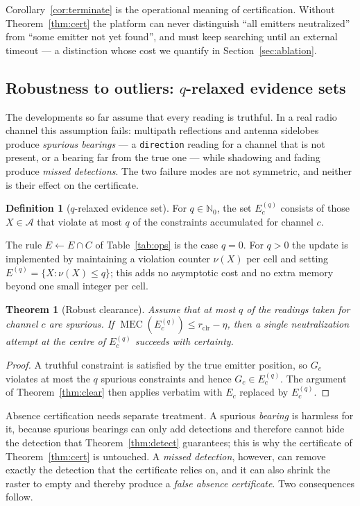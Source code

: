 \documentclass[journal,10pt]{IEEEtran}
\newtheorem{theorem}{Theorem}
\theoremstyle{definition}
\newtheorem{definition}{Definition}
\newcommand{\MEC}{\operatorname{MEC}}
\newcommand{\bA}{\mathcal{A}}
\begin{document}
Corollary~\ref{cor:terminate} is the operational meaning of certification. Without
Theorem~\ref{thm:cert} the platform can never distinguish ``all emitters neutralized'' from
``some emitter not yet found'', and must keep searching until an external timeout --- a
distinction whose cost we quantify in Section~\ref{sec:ablation}.


\subsection{Robustness to outliers: $q$-relaxed evidence sets}
\label{sec:robust}

The developments so far assume that every reading is truthful. In a real radio channel this
assumption fails: multipath reflections and antenna sidelobes produce \emph{spurious bearings}
--- a \texttt{direction} reading for a channel that is not present, or a bearing far from the true
one --- while shadowing and fading produce \emph{missed detections}. The two failure modes are not
symmetric, and neither is their effect on the certificate.

\begin{definition}[$q$-relaxed evidence set]
\label{def:qrelax}
For $q\in\mathbb{N}_0$, the set $E_c^{(q)}$ consists of those $X\in\bA$ that violate at most
$q$ of the constraints accumulated for channel $c$.
\end{definition}

The rule $E\leftarrow E\cap C$ of Table~\ref{tab:ops} is the case $q=0$. For $q>0$ the update is
implemented by maintaining a violation counter $\nu(X)$ per cell and setting
$E^{(q)}=\{X:\nu(X)\le q\}$; this adds no asymptotic cost and no extra memory beyond one small
integer per cell.

\begin{theorem}[Robust clearance]
\label{thm:robustclear}
Assume that at most $q$ of the readings taken for channel $c$ are spurious. If
$\MEC(E_c^{(q)})\le r_{\mathrm{clr}}-\eta$, then a single neutralization attempt at the centre of
$E_c^{(q)}$ succeeds with certainty.
\end{theorem}
\begin{proof}
A truthful constraint is satisfied by the true emitter position, so $G_c$ violates at most the $q$
spurious constraints and hence $G_c\in E_c^{(q)}$. The argument of Theorem~\ref{thm:clear} then
applies verbatim with $E_c$ replaced by $E_c^{(q)}$.
\end{proof}

Absence certification needs separate treatment. A spurious \emph{bearing} is harmless for it,
because spurious bearings can only add detections and therefore cannot hide the detection that
Theorem~\ref{thm:detect} guarantees; this is why the certificate of Theorem~\ref{thm:cert} is
untouched. A \emph{missed detection}, however, can remove exactly the detection that the
certificate relies on, and it can also shrink the raster to empty and thereby produce a
\emph{false absence certificate}. Two consequences follow.
\end{document}
